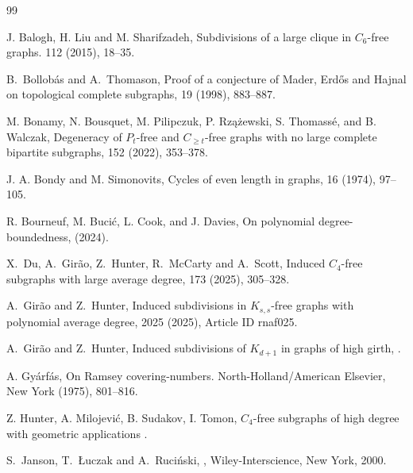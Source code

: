 \documentclass[10pt, a4paper]{article}
\numberwithin{theorem}{section} %
\theoremstyle{remark}
\theoremstyle{definition}
\begin{document}
\begin{thebibliography}{99}

J. Balogh, H. Liu and M. Sharifzadeh, 
\newblock Subdivisions of a large clique in $C_6$-free graphs. 
 112 (2015), 18--35.

B.~Bollob\'as and A.~Thomason,
\newblock Proof of a conjecture of Mader, Erd\H{o}s and Hajnal on topological complete subgraphs,
 19 (1998), 883--887.

M. Bonamy, N. Bousquet, M. Pilipczuk, P. Rz\k{a}\.zewski, S. Thomassé, and B. Walczak,
\newblock Degeneracy of $P_t$-free and $C_{\geq t}$-free graphs with no large complete bipartite subgraphs, 
 152 (2022), 353--378.

 J. A. Bondy and M. Simonovits, 
\newblock
Cycles of even length in graphs, 
 16 (1974), 97--105.

R. Bourneuf, M. Bucić, L. Cook, and J. Davies,
\newblock On polynomial degree-boundedness, 
 (2024).

X.~Du, A.~Gir\~ao, Z.~Hunter, R.~McCarty and A.~Scott,
\newblock Induced $C_4$-free subgraphs with large average degree,
 173 (2025), 305--328.

A.~Gir\~ao and Z.~Hunter,
\newblock Induced subdivisions in $K_{s,s}$-free graphs with polynomial average degree,
 2025 (2025), Article ID rnaf025.

A.~Gir\~ao and Z.~Hunter,
\newblock Induced subdivisions of $K_{d+1}$ in graphs of high girth,
.

A. Gy\'arf\'as, 
\newblock On Ramsey covering-numbers. 
 North-Holland/American Elsevier, New York (1975), 801--816.

Z. Hunter, A. Milojevi\'c, B. Sudakov, I. Tomon,
\newblock $C_4$-free subgraphs of high degree with geometric applications
.

S.~Janson, T.~{\L}uczak and A.~Ruci\'nski,
,
\newblock Wiley-Interscience, New York, 2000.


\end{thebibliography}
\end{document}
